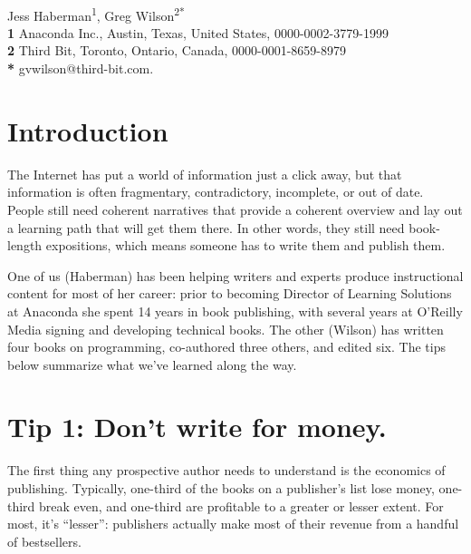 \documentclass[10pt,letterpaper]{article}
\begin{document}
\vspace*{0.2in}

\begin{flushleft}
{\Large
\textbf{}
}
\newline
\\
{Jess Haberman}\textsuperscript{1},
{Greg Wilson}\textsuperscript{2*}
\\
\bigskip
\textbf{1} Anaconda Inc., Austin, Texas, United States, 0000-0002-3779-1999\\
\textbf{2} Third Bit, Toronto, Ontario, Canada, 0000-0001-8659-8979\\
\textbf{*} gvwilson@third-bit.com.
\end{flushleft}

\section*{Introduction}

The Internet has put a world of information just a click away,
but that information is often fragmentary, contradictory, incomplete, or out of date.
People still need coherent narratives that provide a coherent overview
and lay out a learning path that will get them there.
In other words,
they still need book-length expositions,
which means someone has to write them and publish them.

One of us (Haberman) has been helping writers and experts produce instructional content for most of her career:
prior to becoming Director of Learning Solutions at Anaconda she spent 14 years in book publishing,
with several years at O'Reilly Media signing and developing technical books.
The other (Wilson) has written four books on programming,
co-authored three others,
and edited six.
The tips below summarize what we've learned along the way.

\section*{Tip 1: Don't write for money.}

The first thing any prospective author needs to understand is
the economics of publishing.
Typically,
one-third of the books on a publisher's list lose money,
one-third break even,
and one-third are profitable to a greater or lesser extent.
For most, it's ``lesser'':
publishers actually make most of their revenue from a handful of bestsellers.
\end{document}
